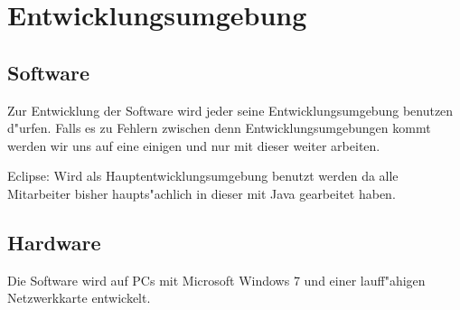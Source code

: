 \documentclass[a4paper,12pt]{scrreprt}
\begin{document}
	
\chapter{Entwicklungsumgebung}
	
	\section{Software}
		Zur Entwicklung der Software wird jeder seine Entwicklungsumgebung benutzen d"urfen. Falls es zu Fehlern zwischen denn Entwicklungsumgebungen kommt werden wir uns auf eine einigen und nur mit dieser weiter arbeiten. 
		
		Eclipse: Wird als Hauptentwicklungsumgebung benutzt werden da alle Mitarbeiter bisher haupts"achlich in dieser mit Java gearbeitet haben.
		
	\section{Hardware}
		
		Die Software wird auf PCs mit Microsoft Windows 7 und einer lauff"ahigen Netzwerkkarte entwickelt.
	
\end{document}
